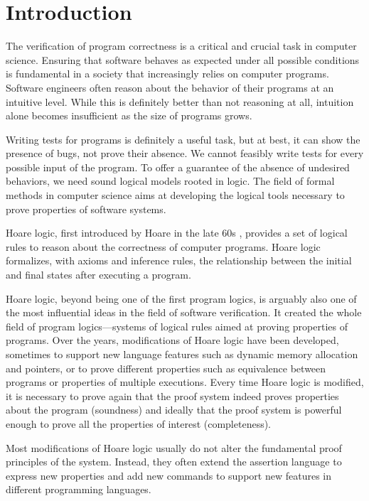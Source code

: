 \chapter*{Introduction}

The verification of program correctness is a critical and crucial task in
computer science. Ensuring that software behaves as expected under all possible
conditions is fundamental in a society that increasingly relies on computer
programs. Software engineers often reason about the behavior of their programs
at an intuitive level. While this is definitely better than not reasoning at
all, intuition alone becomes insufficient as the size of programs grows.

Writing tests for programs is definitely a useful task, but at best, it can
show the presence of bugs, not prove their absence. We cannot feasibly write
tests for every possible input of the program. To offer a guarantee of the
absence of undesired behaviors, we need sound logical models rooted in logic.
The field of formal methods in computer science aims at developing the logical
tools necessary to prove properties of software systems.

Hoare logic, first introduced by Hoare in the late 60s \cite{Hoare69}, provides
a set of logical rules to reason about the correctness of computer programs.
Hoare logic formalizes, with axioms and inference rules, the relationship
between the initial and final states after executing a program.

Hoare logic, beyond being one of the first program logics, is arguably also one
of the most influential ideas in the field of software verification. It created
the whole field of program logics—systems of logical rules aimed at proving
properties of programs. Over the years, modifications of Hoare logic have been
developed, sometimes to support new language features such as dynamic memory
allocation and pointers, or to prove different properties such as equivalence
between programs or properties of multiple executions. Every time Hoare logic
is modified, it is necessary to prove again that the proof system indeed proves
properties about the program (soundness) and ideally that the proof system is
powerful enough to prove all the properties of interest (completeness).

Most modifications of Hoare logic usually do not alter the fundamental proof
principles of the system. Instead, they often extend the assertion language to
express new properties and add new commands to support new features in
different programming languages.

